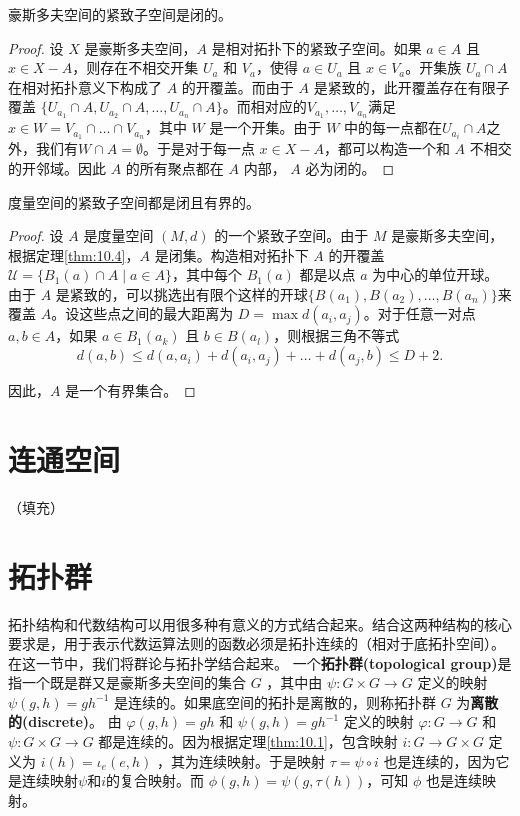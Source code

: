 \begin{theorem}\label{thm:10.13} 
	豪斯多夫空间的紧致子空间是闭的。
\end{theorem}

\begin{proof}
设 $X$ 是豪斯多夫空间，$A$ 是相对拓扑下的紧致子空间。如果 $a\in A$ 且 $x\in X-A$，则存在不相交开集 $U_{a}$ 和 $V_{a}$，使得 $a\in U_{a}$ 且 $x\in V_{a}$。开集族 $U_{a} \cap A$ 在相对拓扑意义下构成了 $A$ 的开覆盖。而由于 $A$ 是紧致的，此开覆盖存在有限子覆盖 $\{U_{a_{1}} \cap A,U_{a_{2}} \cap A,\dotsc ,U_{a_{n}} \cap A\}$。而相对应的$V_{a_{1}} ,\dotsc ,V_{a_{n}}$满足$x\in W=V_{a_{1}} \cap \dotsc \cap V_{a_{n}}$，其中 $W$ 是一个开集。由于 $W$ 中的每一点都在$U_{a_{i}} \cap A$之外，我们有$W\cap A=\emptyset $。于是对于每一点 $x\in X-A$，都可以构造一个和 $A$ 不相交的开邻域。因此 $A$ 的所有聚点都在 $A$ 内部， $A$ 必为闭的。
\end{proof}

\begin{theorem}\label{thm:10.14} 
	度量空间的紧致子空间都是闭且有界的。
\end{theorem}

\begin{proof}
	设 $A$ 是度量空间 $(M,d)$ 的一个紧致子空间。由于 $M$ 是豪斯多夫空间，根据定理\ref{thm:10.4}，$A$ 是闭集。构造相对拓扑下 $A$ 的开覆盖$\mathcal{U} =\{B_{1} (a)\cap A\mid a\in A\}$，其中每个 $B_{1} (a)$ 都是以点 $a$ 为中心的单位开球。由于 $A$ 是紧致的，可以挑选出有限个这样的开球$\{B(a_{1} ),B(a_{2} ),\dotsc ,B(a_{n} )\}$来覆盖 $A$。设这些点之间的最大距离为 $D=\max d(a_{i} ,a_{j} )$。对于任意一对点 $a,b\in A$，如果 $a\in B_{1} (a_{k} )$ 且 $b\in B(a_{l} )$，则根据三角不等式
\begin{equation*}
d(a,b)\leq d(a,a_{i} )+d(a_{i} ,a_{j} )+\dotsc +d(a_{j} ,b)\leq D+2.
\end{equation*}

因此，$A$ 是一个有界集合。
\end{proof}

\section{连通空间}
（填充）
\section{拓扑群}

拓扑结构和代数结构可以用很多种有意义的方式结合起来。结合这两种结构的核心要求是，用于表示代数运算法则的函数必须是拓扑连续的（相对于底拓扑空间）。在这一节中，我们将群论与拓扑学结合起来。
	一个\textbf{拓扑群(topological group)}是指一个既是群又是豪斯多夫空间的集合 $ G$ ，其中由 $\psi :G\times G\rightarrow G$ 定义的映射 $\psi (g,h)=gh^{-1}$ 是连续的。如果底空间的拓扑是离散的，则称拓扑群 $G$ 为\textbf{离散的(discrete)}。
	由 $\varphi (g,h)=gh$ 和 $\psi (g,h)=gh^{-1}$ 定义的映射 $\varphi :G\rightarrow G$ 和 $\psi :G\times G\rightarrow G$ 都是连续的。因为根据定理\ref{thm:10.1}，包含映射 $i:G\rightarrow G\times G$ 定义为 $i(h)=\iota _{e} (e,h)$ ，其为连续映射。于是映射 $\tau =\psi \circ i$ 也是连续的，因为它是连续映射$ \psi $和$ i$的复合映射。而 $\phi ( g,h) =\psi (g,\tau (h))$，可知 $\phi $ 也是连续映射。

